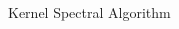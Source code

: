\documentclass[final,t]{beamer}
\begin{document}
\begin{frame}{}
\begin{columns}[t]
\begin{column}{.3\linewidth}


      \begin{block}{Kernel Spectral Algorithm}
      

\end{block}
\end{column}
\end{columns}
\end{frame}
\end{document}
